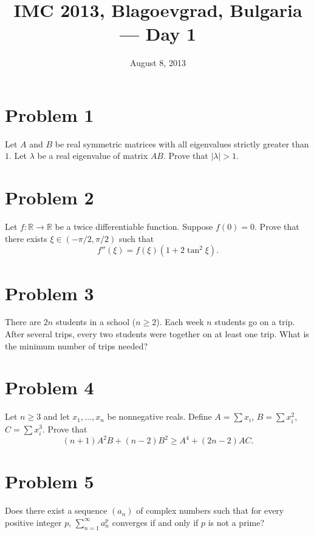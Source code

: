 \documentclass{article}
\title{IMC 2013, Blagoevgrad, Bulgaria --- Day 1}
\date{August 8, 2013}
\begin{document}
\maketitle

\section*{Problem 1}
Let $A$ and $B$ be real symmetric matrices with all eigenvalues strictly greater than $1$. Let $\lambda$ be a real eigenvalue of matrix $AB$. Prove that $|\lambda| > 1$.

\section*{Problem 2}
Let $f : \mathbb{R} \to \mathbb{R}$ be a twice differentiable function. Suppose $f(0) = 0$. Prove that there exists $\xi \in (-\pi/2, \pi/2)$ such that
\[ f''(\xi) = f(\xi)(1 + 2\tan^2 \xi). \]

\section*{Problem 3}
There are $2n$ students in a school ($n \ge 2$). Each week $n$ students go on a trip. After several trips, every two students were together on at least one trip. What is the minimum number of trips needed?

\section*{Problem 4}
Let $n \ge 3$ and let $x_1, \dots, x_n$ be nonnegative reals. Define $A = \sum x_i$, $B = \sum x_i^2$, $C = \sum x_i^3$. Prove that
\[ (n+1) A^2 B + (n-2) B^2 \ge A^4 + (2n-2) AC. \]

\section*{Problem 5}
Does there exist a sequence $(a_n)$ of complex numbers such that for every positive integer $p$, $\sum_{n=1}^\infty a_n^p$ converges if and only if $p$ is not a prime?
\end{document}

